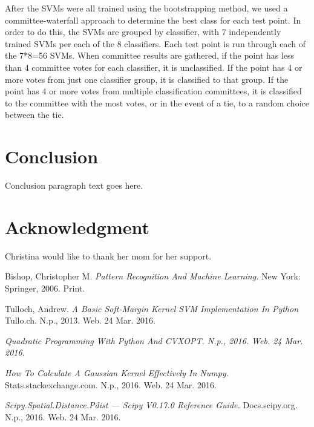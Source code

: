 \documentclass[journal]{IEEEtran}
\begin{document}
After the SVMs were all trained using the bootstrapping method, we used a committee-waterfall approach to determine the best class for each test point.  In order to do this, the SVMs are grouped by classifier, with 7 independently trained SVMs per each of the 8 classifiers.  Each test point is run through each of the 7*8=56 SVMs.  When committee results are gathered, if the point has less than 4 committee votes for each classifier, it is unclassified.  If the point has 4 or more votes from just one classifier group, it is classified to that group. If the point has 4 or more votes from multiple classification committees, it is classified to the committee with the most votes, or in the event of a tie, to a random choice between the tie.

\section{Conclusion}
Conclusion paragraph text goes here.

\section*{Acknowledgment}

Christina would like to thank her mom for her support.

\ifCLASSOPTIONcaptionsoff
  \newpage
\fi

\begin{thebibliography}{1}

  Bishop, Christopher M. \emph{Pattern Recognition And Machine Learning.} New York: Springer, 2006. Print.

  Tulloch, Andrew. \emph{A Basic Soft-Margin Kernel SVM Implementation In Python} Tullo.ch. N.p., 2013. Web. 24 Mar. 2016.

  \emph{Quadratic Programming With Python And CVXOPT. N.p., 2016. Web. 24 Mar. 2016.}

  \emph{How To Calculate A Gaussian Kernel Effectively In Numpy.} Stats.stackexchange.com. N.p., 2016. Web. 24 Mar. 2016.

  \emph{Scipy.Spatial.Distance.Pdist — Scipy V0.17.0 Reference Guide.} Docs.scipy.org. N.p., 2016. Web. 24 Mar. 2016.

\end{thebibliography}
\end{document}
